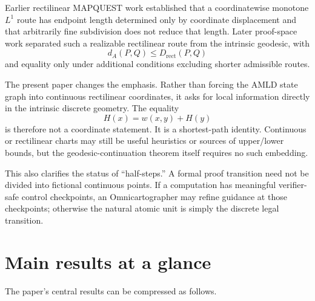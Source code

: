 \documentclass[11pt]{article}
\theoremstyle{definition}
\theoremstyle{remark}
\begin{document}
Earlier rectilinear MAPQUEST work established that a coordinatewise monotone $L^1$ route has endpoint length determined only by coordinate displacement and that arbitrarily fine subdivision does not reduce that length. Later proof-space work separated such a realizable rectilinear route from the intrinsic geodesic, with
\[
d_A(P,Q)\le D_{\mathrm{rect}}(P,Q)
\]
and equality only under additional conditions excluding shorter admissible routes.

The present paper changes the emphasis. Rather than forcing the AMLD state graph into continuous rectilinear coordinates, it asks for local information directly in the intrinsic discrete geometry. The equality
\[
H(x)=w(x,y)+H(y)
\]
is therefore not a coordinate statement. It is a shortest-path identity. Continuous or rectilinear charts may still be useful heuristics or sources of upper/lower bounds, but the geodesic-continuation theorem itself requires no such embedding.

This also clarifies the status of ``half-steps.'' A formal proof transition need not be divided into fictional continuous points. If a computation has meaningful verifier-safe control checkpoints, an Omnicartographer may refine guidance at those checkpoints; otherwise the natural atomic unit is simply the discrete legal transition.

\section{Main results at a glance}
The paper's central results can be compressed as follows.
\end{document}
